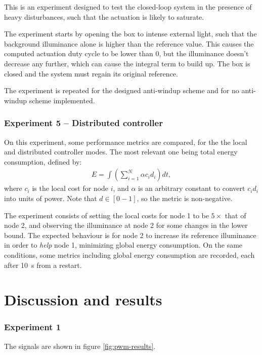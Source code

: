 \documentclass[english,fira]{ist-report}
\begin{document}
This is an experiment designed to test the closed-loop system in the presence of heavy disturbances, such that the actuation is likely to saturate.

The experiment starts by opening the box to intense external light, such that the background illuminance alone is higher than the reference value. 
This causes the computed actuation duty cycle to be lower than 0, but the illuminance doesn't decrease any further, which can cause the integral term to build up. 
The box is closed and the system must regain its original reference.

The experiment is repeated for the designed anti-windup scheme and for no anti-windup scheme implemented.

\subsubsection*{Experiment 5 -- Distributed controller}

On this experiment, some performance metrics are compared, for the the local and distributed controller modes. The most relevant one being total energy consumption, defined by:
\begin{align}
    E = \int \left( \sum_{i=1}^N \alpha c_i d_i \right)dt,
    \label{eq:energy}
\end{align}
where $c_i$ is the local cost for node $i$, and $\alpha$ is an arbitrary constant to convert $c_i d_i$ into units of power.
Note that $d \in [0-1]$, so the metric is non-negative.

The experiment consists of setting the local costs for node 1 to be $5\times$ that of node 2, and observing the illuminance at node 2 for some changes in the lower bound. 
The expected behaviour is for node 2 to increase its reference illuminance in order to \textit{help} node 1, minimizing global energy consumption.
On the same conditions, some metrics including global energy consumption are recorded, each after \SI{10}{\second} from a restart.

\section{Discussion and results} \label{sec:results}

\subsubsection*{Experiment 1}

The signals are shown in figure \ref{fig:pwm-results}. 
\end{document}
